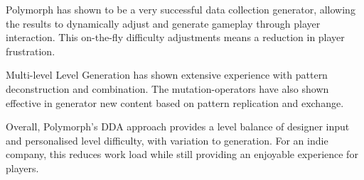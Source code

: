 \documentclass{scrartcl}
\begin{document}
Polymorph has shown to be a very successful data collection generator, allowing the results to dynamically adjust and generate gameplay through player interaction. This on-the-fly difficulty adjustments means a reduction in player frustration. 

Multi-level Level Generation has shown extensive experience with pattern deconstruction and combination. The mutation-operators have also shown effective in generator new content based on pattern replication and exchange. 

Overall, Polymorph's DDA approach provides a level balance of designer input and personalised level difficulty, with variation to generation. For an indie company, this reduces work load while still providing an enjoyable experience for players.




\end{document}
